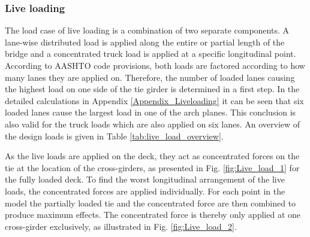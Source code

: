 \subsubsection{Live loading} \label{sec:met_loads_live}
The load case of live loading is a combination of two separate components. A lane-wise distributed load is applied along the entire or partial length of the bridge and a concentrated truck load is applied at a specific longitudinal point. According to AASHTO code provisions, both loads are factored according to how many lanes they are applied on. Therefore, the number of loaded lanes causing the highest load on one side of the tie girder is determined in a first step. In the detailed calculations in Appendix \ref{Appendix_Liveloading} it can be seen that six loaded lanes cause the largest load in one of the arch planes. This conclusion is also valid for the truck loads which are also applied on six lanes. An overview of the design loads is given in Table \ref{tab:live_load_overview}. 



As the live loads are applied on the deck, they act as concentrated forces on the tie at the location of the cross-girders, as presented in Fig. \ref{fig:Live_load_1} for the fully loaded deck. To find the worst longitudinal arrangement of the live loads, the concentrated forces are applied individually. For each point in the model the partially loaded tie and the concentrated force are then combined to produce maximum effects. The concentrated force is thereby only applied at one cross-girder exclusively, as illustrated in Fig. \ref{fig:Live_load_2}. 


